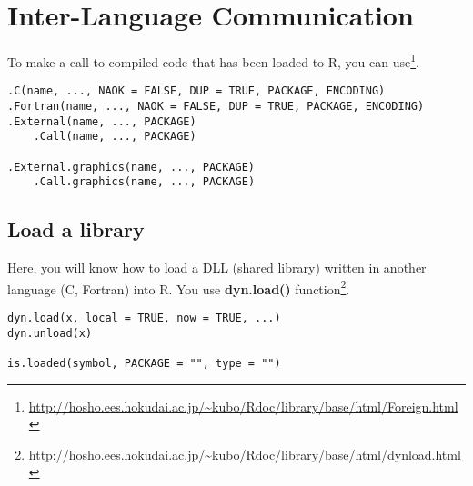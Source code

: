 
\chapter{Inter-Language Communication}
\label{chap:inter-lang-comm}


To make a call to compiled code that has been loaded to R, you can
use\footnote{\url{http://hosho.ees.hokudai.ac.jp/~kubo/Rdoc/library/base/html/Foreign.html}}.
\begin{lstlisting}
.C(name, ..., NAOK = FALSE, DUP = TRUE, PACKAGE, ENCODING)
.Fortran(name, ..., NAOK = FALSE, DUP = TRUE, PACKAGE, ENCODING)
.External(name, ..., PACKAGE)
    .Call(name, ..., PACKAGE)

.External.graphics(name, ..., PACKAGE)
    .Call.graphics(name, ..., PACKAGE)
\end{lstlisting}

\section{Load a library}
\label{sec:load-library}

Here, you will know how to load a DLL (shared library) written in
another language (C, Fortran) into R. You use {\bf dyn.load()}
function\footnote{\url{http://hosho.ees.hokudai.ac.jp/~kubo/Rdoc/library/base/html/dynload.html}}.
\begin{lstlisting}
dyn.load(x, local = TRUE, now = TRUE, ...)
dyn.unload(x)

is.loaded(symbol, PACKAGE = "", type = "")
\end{lstlisting}


